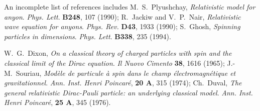 \documentclass[a4paper,11pt]{article}
\begin{document}
\begin{thebibliography}{99}
An incomplete list of references includes
M.~S.~Plyushchay,
{\it Relativistic model for anyon}.
{\sl Phys. Lett}. {\bf B248}, 107 (1990);
R.~Jackiw and V.~P.~Nair,
{\it Relativistic wave equation for anyons}.
{\sl Phys. Rev.} {\bf D43}, 1933 (1990);
S.~Ghosh,
{\it Spinning particles in \coordHE{} dimensions}.
{\sl Phys. Lett}. {\bf B338}, 235 (1994).


W.~G.~Dixon,
  {\it On a classical theory of charged particles with spin and the
  classical limit of the Dirac equation}.
  {\sl Il Nuovo Cimento} {\bf 38}, 1616 (1965);
J.-M.~Souriau,
{\it Mod\`ele de particule \`a spin dans le champ
\'electromagn\'etique et gravitationnel}.
  {\sl Ann. Inst. Henri Poincar\'e}, {\bf 20 A}, 315 (1974);
Ch.~Duval,
{\it The general relativistic Dirac-Pauli particle:
an underlying classical model}.
{\sl Ann. Inst. Henri Poincar\'e}, {\bf 25 A}, 345 (1976).


\end{thebibliography}
\end{document}
